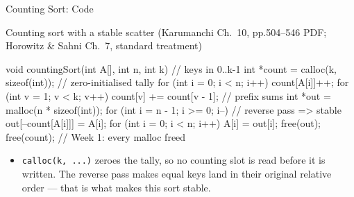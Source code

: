 \documentclass[aspectratio=169]{beamer}
\begin{document}
\begin{frame}[fragile]{Counting Sort: Code}
  \footnotesize
  \begin{block}{Counting sort with a stable scatter (Karumanchi Ch.~10,
    pp.504--546 PDF; Horowitz \& Sahni Ch.~7, standard treatment)
    \cite{Karumanchi2017_data_structures_algorithms_made_easy,HorowitzSahni2008_fundamentals_data_structures}}
\begin{semiverbatim}
void countingSort(int A[], int n, int k) {   // keys in 0..k-1
  int *count = calloc(k, sizeof(int));       // zero-initialised tally
  for (int i = 0; i < n; i++) count[A[i]]++;
  for (int v = 1; v < k; v++) count[v] += count[v - 1];  // prefix sums
  int *out = malloc(n * sizeof(int));
  for (int i = n - 1; i >= 0; i--)           // reverse pass => stable
    out[--count[A[i]]] = A[i];
  for (int i = 0; i < n; i++) A[i] = out[i];
  free(out); free(count);                    // Week 1: every malloc freed
}
\end{semiverbatim}
  \end{block}
  \begin{itemize}
    \item \texttt{calloc(k, ...)} zeroes the tally, so no counting slot is
      read before it is written. The reverse pass makes equal keys land in
      their original relative order --- that is what makes this sort stable.
  \end{itemize}
\end{frame}
\end{document}
